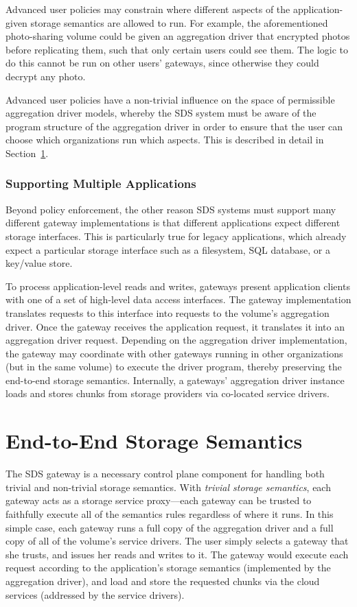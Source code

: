 Advanced user policies may constrain where different aspects of the
application-given storage semantics are allowed to run.  For example, the
aforementioned photo-sharing volume could be given an aggregation driver that
encrypted photos before replicating them, such that only certain users could see
them.  The logic to do this cannot be run on other users' gateways, since
otherwise they could decrypt any photo.

Advanced user policies have a non-trivial influence on the space of
permissible aggregation driver models, whereby the SDS system must
be aware of the program structure of the aggregation driver in order to ensure
that the user can choose which organizations run which aspects.  This is
described in detail in Section~\ref{sec:aggregation-driver-model}.

\subsubsection{Supporting Multiple Applications}

Beyond policy enforcement, the other reason SDS systems must support many different
gateway implementations is that different applications expect different storage
interfaces.  This is particularly true for legacy applications, which already
expect a particular storage interface such as a filesystem, SQL database, or a
key/value store.

To process application-level reads and writes, gateways present
application clients with one of a set of high-level data access
interfaces.  The gateway implementation translates requests to this interface
into requests to the volume's aggregation driver.
Once the gateway receives the application request, it translates
it into an aggregation driver request.  Depending on the aggregation
driver implementation, the gateway may coordinate with other
gateways running in other organizations (but in the same volume) to
execute the driver program, thereby preserving the end-to-end storage semantics.
Internally, a gateways' aggregation driver instance loads and stores chunks from
storage providers via co-located service drivers.

\section{End-to-End Storage Semantics}
\label{sec:aggregation-driver-model}

The SDS gateway is a necessary control plane component for handling both trivial and non-trivial
storage semantics.  With \emph{trivial storage semantics}, each gateway acts as a
storage service proxy---each gateway can be trusted
to faithfully execute all of the semantics rules regardless of where it runs.
In this simple case, each gateway runs a full copy of the aggregation driver
and a full copy of all of the volume's service drivers.  The user
simply selects a gateway that she trusts, and issues her reads and writes to it.
The gateway would execute each request according to the application's storage semantics
(implemented by the aggregation driver), and load and store the requested chunks
via the cloud services (addressed by the service drivers).

